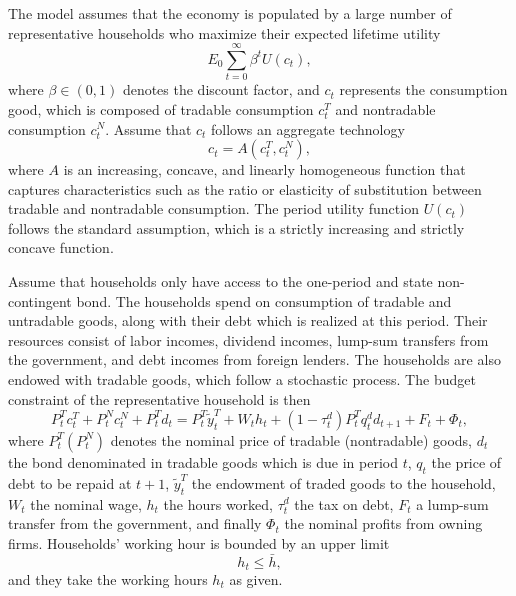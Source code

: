The model assumes that the economy is populated by a large number of representative households who maximize their expected lifetime utility
\begin{equation}
    \label{eq:utility}
    E_0 \sum_{t=0}^\infty \beta^t U(c_t),
\end{equation}
where $\beta \in(0,1)$ denotes the discount factor,
and $c_t$ represents the consumption good, which is composed of
tradable consumption $c_t^T$ and nontradable consumption $c_t^N$.
Assume that $c_t$ follows an aggregate technology
\begin{equation}
    \label{eq:A}
    c_t = A(c^T_t, c^N_t),
\end{equation}
where $A$ is an increasing, concave, and linearly homogeneous function that captures characteristics such as the ratio or elasticity of substitution between tradable and nontradable consumption.
The period utility function $U(c_t)$ follows the standard assumption, which is a strictly increasing and strictly concave function.

Assume that households only have access to the one-period and state non-contingent bond.
The households spend on consumption of tradable and untradable goods, along with their debt which is realized at this period. Their resources consist of labor incomes, dividend incomes, lump-sum transfers from the government, and debt incomes from foreign lenders. The households are also endowed with tradable goods, which follow a stochastic process.
The budget constraint of the representative household is then
\begin{equation}
    \label{eq:bc}
    P^T_t c^T_t + P^N_t c^N_t + P^T_t d_t =
    P^T_t \tilde{y}^T_t + W_t h_t + (1- \tau^d_t)P^T_t q^d_t d_{t+1} + F_t + \Phi_t,
\end{equation}
where $P^T_t (P^N_t)$ denotes the nominal price of tradable (nontradable) goods, $d_t$ the bond denominated in tradable goods which is due in period $t$, $q_t$ the price of debt to be repaid at $t+1$, $\tilde{y}^T_t$ the endowment of traded goods to the household, $W_t$ the nominal wage, $h_t$ the hours worked, $\tau^d_t$ the tax on debt, $F_t$ a lump-sum transfer from the government, and finally $\Phi_t$ the nominal profits from owning firms.
Households' working hour is bounded by an upper limit
\begin{equation}
    \label{eq:h-constraint}
    h_t \le \bar{h},
\end{equation}
and they take the working hours $h_t$ as given.

